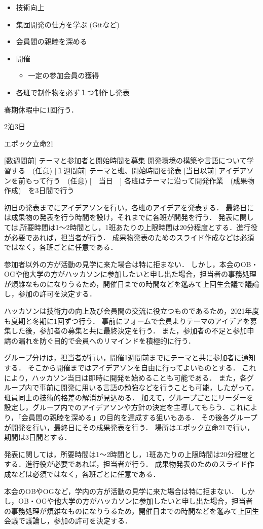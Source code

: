\begin{itemize}
    \item 技術向上
    \item 集団開発の仕方を学ぶ (Gitなど)
    \item 会員間の親睦を深める
    \item 開催
    \begin{itemize}
        \item 一定の参加会員の獲得
    \end{itemize}
    \item 各班で制作物を必ず１つ制作し発表
\end{itemize}


春期休暇中に1回行う．

2泊3日

エポック立命21

[数週間前]	テーマと参加者と開始時間を募集
           開発環境の構築や言語について学習する　(任意)
[１週間前]	テーマと班、開始時間を発表
[当日以前]	アイデアソンを前もって行う　(任意)
[　当日　]	各班はテーマに沿って開発作業　(成果物作成)　を3日間で行う

初日の発表までにアイデアソンを行い，各班のアイデアを発表する．
最終日には成果物の発表を行う時間を設け，それまでに各班が開発を行う．
発表に関しては,所要時間は1～2時間とし，1班あたりの上限時間は20分程度とする．進行役が必要であれば，担当者が行う．
成果物発表のためのスライド作成などは必須ではなく，各班ごとに任意である．


参加者以外の方が活動の見学に来た場合は特に拒まない．
しかし，本会のOB・OGや他大学の方がハッカソンに参加したいと申し出た場合，担当者の事務処理が煩雑なものになりうるため，開催日までの時間などを鑑みて上回生会議で議論し，参加の許可を決定する．


ハッカソンは技術力の向上及び会員間の交流に役立つものであるため，2021年度も夏期と冬期に1回ずつ行う．
事前にフォームで会員よりテーマのアイデアを募集した後，参加者の募集と共に最終決定を行う．
また，参加者の不足と参加申請の漏れを防ぐ目的で会員へのリマインドを積極的に行う．


グループ分けは，担当者が行い，開催1週間前までにテーマと共に参加者に通知する．
そこから開催まではアイデアソンを自由に行ってよいものとする．
これにより，ハッカソン当日は即時に開発を始めることも可能である．
また，各グループ内で事前に開発に用いる言語の勉強などを行うことも可能，したがって，班員同士の技術的格差の解消が見込める．
加えて，グループごとにリーダーを設定し，グループ内でのアイデアソンや方針の決定を主導してもらう．これにより，「会員間の親睦を深める」の目的を達成する狙いもある．
その後各グループが開発を行い，最終日にその成果発表を行う．
場所はエポック立命21で行い，期間は3日間とする．

発表に関しては，所要時間は1～2時間とし，1班あたりの上限時間は20分程度とする．進行役が必要であれば，担当者が行う．
成果物発表のためのスライド作成などは必須ではなく，各班ごとに任意である．

本会のOBやOGなど，学内の方が活動の見学に来た場合は特に拒まない．
しかし，OB・OGや他大学の方がハッカソンに参加したいと申し出た場合，担当者の事務処理が煩雑なものになりうるため，開催日までの時間などを鑑みて上回生会議で議論し，参加の許可を決定する．

